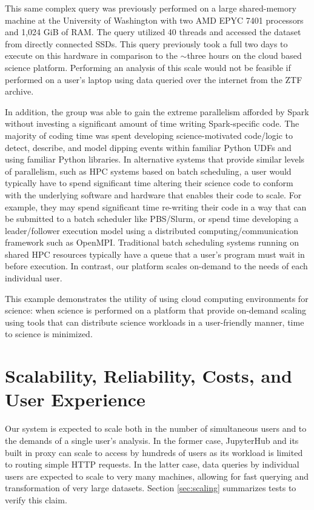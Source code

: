 \documentclass[twocolumn, linenumbers]{aastex631}
\begin{document}
This same complex query was previously performed on a large shared-memory machine at the University of Washington with two AMD EPYC 7401 processors and 1,024 GiB of RAM. The query utilized 40 threads and accessed the dataset from directly connected SSDs. This query previously took a full two days to execute on this hardware in comparison to the ${\sim}$three hours on the cloud based science platform. Performing an analysis of this scale would not be feasible if performed on a user's laptop using data queried over the internet from the ZTF archive.

In addition, the group was able to gain the extreme parallelism afforded by Spark without investing a significant amount of time writing Spark-specific code. The majority of coding time was spent developing science-motivated code/logic to detect, describe, and model dipping events within familiar Python UDFs and using familiar Python libraries. In alternative systems that provide similar levels of parallelism, such  as HPC systems based on batch scheduling, a user would typically have to spend significant time altering their science code to conform with the underlying software and hardware that enables their code to scale. For example, they may spend significant time re-writing their code in a way that can be submitted to a batch scheduler like PBS/Slurm, or spend time developing a leader/follower execution model using a distributed computing/communication framework such as OpenMPI. Traditional batch scheduling systems running on shared HPC resources typically have a queue that a user's program must wait in before execution. In contrast, our platform scales on-demand to the needs of each individual user.

This example demonstrates the utility of using cloud computing environments for science: when science is performed on a platform that provide on-demand scaling using tools that can distribute science workloads in a user-friendly manner, time to science is minimized.

\section{Scalability, Reliability, Costs, and User Experience}

Our system is expected to scale both in the number of simultaneous users and to the demands of a single user's analysis. In the former case, JupyterHub and its built in proxy can scale to access by hundreds of users as its workload is limited to routing simple HTTP requests. In the latter case, data queries by individual users are expected to scale to very many machines, allowing for fast querying and transformation of very large datasets. Section \ref{sec:scaling} summarizes tests to verify this claim.
\end{document}
